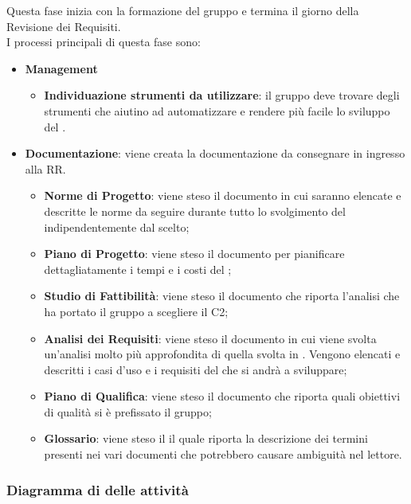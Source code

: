 	Questa fase inizia con la formazione del gruppo e termina il giorno della Revisione dei Requisiti. \\
	I processi principali di questa fase sono: 
	\begin{itemize}
		\item \textbf{Management}
			\att
			\begin{itemize} %
				\item \textbf{Individuazione strumenti da utilizzare}: il gruppo deve trovare degli strumenti che aiutino ad automatizzare e rendere più facile lo sviluppo del .
			\end{itemize}
		\item \textbf{Documentazione}: viene creata la documentazione da consegnare in ingresso alla RR.
		\att
		\begin{itemize} %
			\item \textbf{Norme di Progetto}: viene steso il documento \NPdocRR{} in cui saranno elencate e descritte le norme da seguire durante tutto lo svolgimento del  indipendentemente dal  scelto; 
			\item \textbf{Piano di Progetto}: viene steso il documento \PPdocRR{} per pianificare dettagliatamente i tempi e i costi del ;
			\item \textbf{Studio di Fattibilità}: viene steso il documento \SFdocRR{} che riporta l'analisi che ha portato il gruppo a scegliere il  C2;
			\item \textbf{Analisi dei Requisiti}: viene steso il documento \ARdocRR{} in cui viene svolta un'analisi molto più approfondita di quella svolta in \SFdocRR. Vengono elencati e descritti i casi d'uso e i requisiti del  che si andrà a sviluppare;
			\item \textbf{Piano di Qualifica}: viene steso il documento \PQdocRR{} che riporta quali obiettivi di qualità si è prefissato il gruppo;
			\item \textbf{Glossario}: viene steso il \GldocRR{} il quale riporta la descrizione dei termini presenti nei vari documenti che potrebbero causare ambiguità nel lettore.
		\end{itemize}
	\end{itemize}
	
		
		\subsubsection{Diagramma di  delle attività}
		
